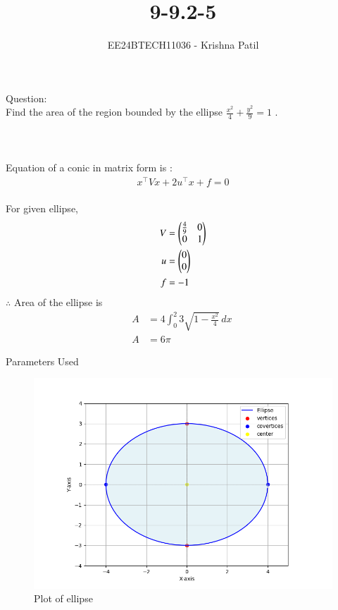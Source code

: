 \documentclass[journal]{IEEEtran}
\begin{document}

\vspace{3cm}

\title{9-9.2-5}
\author{EE24BTECH11036 - Krishna Patil}
{\let\newpage\relax\maketitle}
Question: \\
 Find the area of the region bounded by the ellipse $ \frac{x^2}{4} + \frac{y^2}{9} = 1 $ . 
 \\ \\
\solution \\ \\
Equation of a conic in matrix form is : \\
\begin{align}
    x^\top V x + 2u^\top {x} + f = 0
\end{align} \\ 
For given ellipse, \\
\begin{align}
    V&= \begin{pmatrix}\frac{4}{9} & 0 \\ 0 & 1\end{pmatrix} \\
    u&= \begin{pmatrix}0 \\ 0\end{pmatrix} \\
    f&=-1 
\end{align}
$ \therefore $ Area of the ellipse is  
\begin{align}
    A &= 4 \int_{0}^{2} 3 \sqrt{1 - \frac{x^2}{4}} \, dx\ \\
    A &= 6\pi
\end{align}
\begin{table}[h!]    	
    \centering
     
    \caption{Parameters Used}
    \label{tab:1-1.9-6}
\end{table}
\begin{figure}[ht]
    \centering
    \includegraphics[width = 1\linewidth]{figs/Figure_1.png}
    \caption{Plot of ellipse}
    \label{fig:stemplot}
\end{figure}
\end{document}
